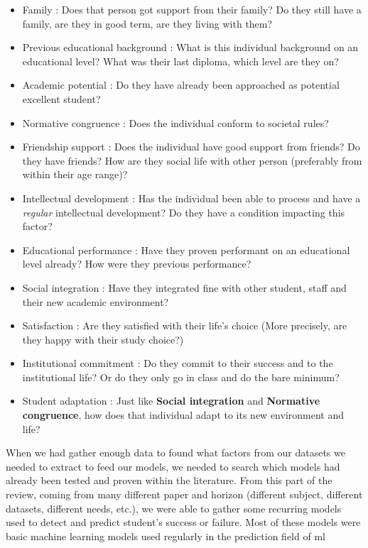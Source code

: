 \documentclass[../main.tex]{subfiles}
\begin{document}
\begin{itemize}
    \item Family : Does that person got support from their family? Do they still have a family, are they in good term, are they living with them?
    \item Previous educational background : What is this individual background on an educational level? What was their last diploma, which level are they on? 
    \item Academic potential : Do they have already been approached as potential excellent student?
    \item Normative congruence : Does the individual conform to societal rules? 
    \item Friendship support : Does the individual have good support from friends? Do they have friends? How are they social life with other person (preferably from within their age range)?
    \item Intellectual development : Has the individual been able to process and have a \textit{regular} intellectual development? Do they have a condition impacting this factor? 
    \item Educational performance : Have they proven performant on an educational level already? How were they previous performance?
    \item Social integration : Have they integrated fine with other student, staff and their new academic environment?
    \item Satisfaction : Are they satisfied with their life's choice (More precisely, are they happy with their study choice?)
    \item Institutional commitment : Do they commit to their success and to the institutional life? Or do they only go in class and do the bare minimum?
    \item Student adaptation : Just like \textbf{Social integration} and \textbf{Normative congruence}, how does that individual adapt to its new environment and life?
\end{itemize}

When we had gather enough data to found what factors from our datasets we needed to extract to feed our models, we needed to search which models had already been tested and proven within the literature. 
From this part of the review, coming from many different paper and horizon (different subject, different datasets, different needs, etc.), we were able to gather some recurring models used to detect and predict student's success or failure. Most of these models were basic machine learning models used regularly in the prediction field of \acrshort{ml}
\end{document}
